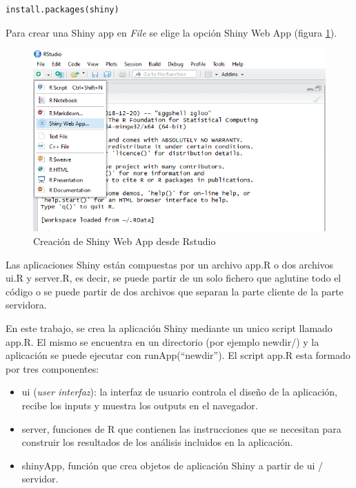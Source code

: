 \begin{lstlisting}[frame=single]
install.packages(shiny)
\end{lstlisting}

Para crear una Shiny app en \emph{File} se elige la opción Shiny Web App (figura \ref{fig:fig322}).

\begin{figure}[h]
\begin{center}
\includegraphics[width=12cm]{./Graficos/figura4}
\end{center}
\caption{Creación de Shiny Web App desde Rstudio}
\label{fig:fig322}
\end{figure}


Las aplicaciones Shiny están compuestas por un archivo app.R o dos archivos ui.R y server.R, es decir, se puede partir de un solo fichero que aglutine todo el código o se puede partir de dos archivos que separan la parte cliente de la parte servidora.

En este trabajo, se crea la aplicación Shiny mediante un unico script llamado app.R. El mismo se encuentra en un directorio (por ejemplo newdir/) y la aplicación se puede ejecutar con runApp(``newdir''). El script app.R esta formado por tres componentes:

\begin{itemize}
\item ui (\emph{user interfaz}): la interfaz de usuario controla el diseño de la aplicación, recibe los inputs y
muestra los outputs en el navegador.
\item server, funciones de R que contienen las instrucciones que se necesitan para construir los resultados de los análisis incluidos en la aplicación.
\item shinyApp, función que crea objetos de aplicación Shiny a partir de ui / servidor.
\end{itemize}


